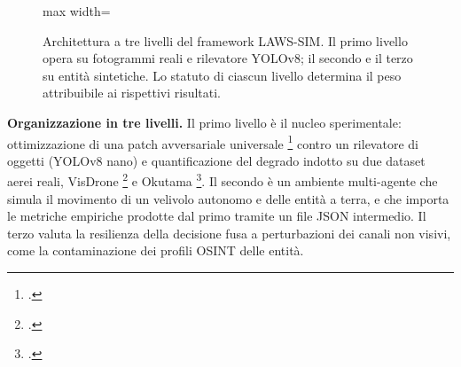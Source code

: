 \documentclass[a4paper,12pt]{report}
\begin{document}
\begin{figure}[htbp]
\centering
\begin{adjustbox}{max width=\textwidth}
\end{adjustbox}
\caption[Architettura a tre livelli del framework LAWS-SIM]{Architettura a
tre livelli del framework LAWS-SIM. Il primo livello opera su fotogrammi reali e
rilevatore YOLOv8; il secondo e il terzo su entità sintetiche. Lo statuto di
ciascun livello determina il peso attribuibile ai rispettivi risultati.}
\label{fig:tre_livelli}
\end{figure}

\textbf{Organizzazione in tre livelli.}
\label{sec:tre_layer}
Il primo livello è il nucleo sperimentale: ottimizzazione di una patch
avversariale universale \footcite{brown_2017_patch,thys_2019} contro un
rilevatore di oggetti (YOLOv8 nano) e quantificazione del degrado indotto su due
dataset aerei reali, VisDrone \footcite{zhu_2021_visdrone} e Okutama
\footcite{barekatain_2017_okutama}. Il secondo è un ambiente multi-agente che
simula il movimento di un velivolo autonomo e delle entità a terra, e che
importa le metriche empiriche prodotte dal primo tramite un file JSON
intermedio. Il terzo valuta la resilienza della decisione fusa a perturbazioni
dei canali non visivi, come la contaminazione dei profili OSINT delle entità.
\end{document}
